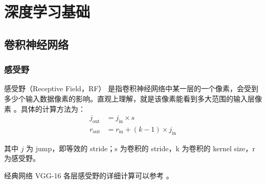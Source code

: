 \part{深度学习基础}

\chapter{卷积神经网络}

\section{感受野}

感受野（Receptive Field，RF） 是指卷积神经网络中某一层的一个像素，会受到多少个输入数据像素的影响。直观上理解，就是该像素能看到多大范围的输入层像素 \cite{2017-Guide-to-RF-cal}。具体的计算方法为：
\begin{align}
j_{\mathrm {out}} & = j_{\mathrm{in}} \times s \\
r_{\mathrm {out}} & = r_{\mathrm{in}} + (k-1) \times j_{\mathrm{in}}
\end{align}

其中 $j$ 为 jump，即等效的 stride；s 为卷积的 stride，k 为卷积的 kernel size，r 为感受野。

经典网络 VGG-16 各层感受野的详细计算可以参考 \cite{2018-VGG-16-RF-cal}。